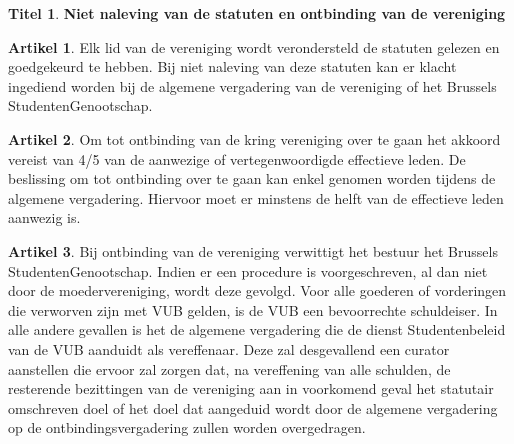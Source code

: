 \documentclass[a4paper,10pt]{article}
\theoremstyle{definition}
\newtheorem{titel}{\large Titel}
\newtheorem{artikel}{\large Artikel}
\newcommand{\ttext}[1]{\large \textbf{#1} \normalsize}
\newcommand{\hnl}{\hfill\newline}
\begin{document}

\begin{titel}\ttext{Niet naleving van de statuten en ontbinding van de vereniging}

  \begin{artikel}\hnl
    Elk lid van de vereniging wordt verondersteld de statuten gelezen en goedgekeurd te hebben.
    Bij niet naleving van deze statuten kan er klacht ingediend worden bij de algemene vergadering van de vereniging of het Brussels StudentenGenootschap.
  \end{artikel}

  \begin{artikel}\hnl
    Om tot ontbinding van de kring vereniging over te gaan het akkoord vereist van 4/5 van de aanwezige of vertegenwoordigde effectieve leden.
    De beslissing om tot ontbinding over te gaan kan enkel genomen worden tijdens de algemene vergadering.
    Hiervoor moet er minstens de helft van de effectieve leden aanwezig is.
  \end{artikel}

  \begin{artikel}\hnl
    Bij ontbinding van de vereniging verwittigt het bestuur het Brussels StudentenGenootschap.
    Indien er een procedure is voorgeschreven, al dan niet door de moedervereniging, wordt deze gevolgd.
    Voor alle goederen of vorderingen die verworven zijn met VUB gelden, is de VUB een bevoorrechte schuldeiser.
    In alle andere gevallen is het de algemene vergadering die de dienst Studentenbeleid van de VUB aanduidt als vereffenaar.
    Deze zal desgevallend een curator aanstellen die ervoor zal zorgen dat, na vereffening van alle schulden, de resterende bezittingen van de vereniging aan in voorkomend geval het statutair omschreven doel of het doel dat aangeduid wordt door de algemene vergadering op de ontbindingsvergadering zullen worden overgedragen.
  \end{artikel}


\end{titel}
\end{document}
